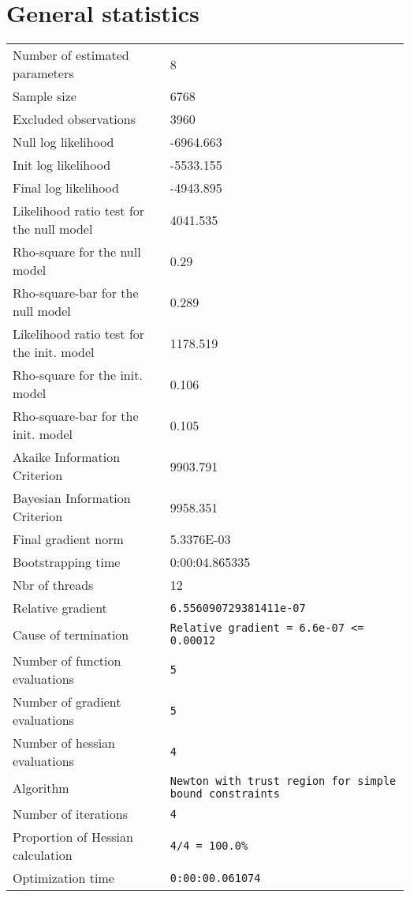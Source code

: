\section{General statistics}
\begin{tabular}{ll}
Number of estimated parameters & 8 \\
Sample size & 6768 \\
Excluded observations & 3960 \\
Null log likelihood & -6964.663 \\
Init log likelihood & -5533.155 \\
Final log likelihood & -4943.895 \\
Likelihood ratio test for the null model & 4041.535 \\
Rho-square for the null model & 0.29 \\
Rho-square-bar for the null model & 0.289 \\
Likelihood ratio test for the init. model & 1178.519 \\
Rho-square for the init. model & 0.106 \\
Rho-square-bar for the init. model & 0.105 \\
Akaike Information Criterion & 9903.791 \\
Bayesian Information Criterion & 9958.351 \\
Final gradient norm & 5.3376E-03 \\
Bootstrapping time & 0:00:04.865335 \\
Nbr of threads & 12 \\
Relative gradient & \verb$6.556090729381411e-07$ \\
Cause of termination & \verb$Relative gradient = 6.6e-07 <= 0.00012$ \\
Number of function evaluations & \verb$5$ \\
Number of gradient evaluations & \verb$5$ \\
Number of hessian evaluations & \verb$4$ \\
Algorithm & \verb$Newton with trust region for simple bound constraints$ \\
Number of iterations & \verb$4$ \\
Proportion of Hessian calculation & \verb$4/4 = 100.0%$ \\
Optimization time & \verb$0:00:00.061074$ \\
\end{tabular}

